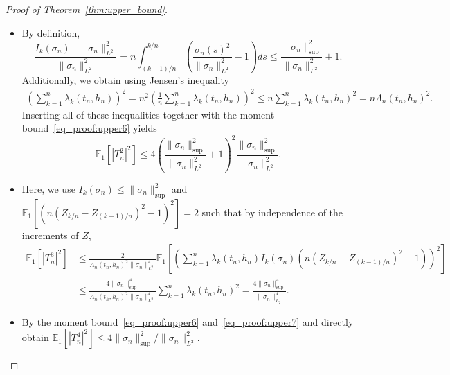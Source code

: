 \documentclass[10.5pt,letter]{article}
\numberwithin{equation}{section}
\theoremstyle{definition}
\newcommand{\E}{\mathbb{E}}
\newcommand{\1}{\mathbbm{1}}
\begin{document}
\begin{proof}[Proof of Theorem~\ref{thm:upper_bound}]
\begin{itemize}
    \item[$\bullet\ \mathbf{T_n^2.}$] By definition,
    \[ \frac{I_k(\sigma_n)-\|\sigma_n\|_{L^2}^2}{\|\sigma_n\|_{L^2}^2} = n\int_{(k-1)/n}^{k/n} \left( \frac{\sigma_n(s)^2}{\|\sigma_n\|_{L^2}^2} -1\right) ds \leq \frac{\|\sigma_n\|_{\sup}^2}{\|\sigma_n\|_{L^2}^2} +1.\]
    Additionally, we obtain using Jensen's inequality
    \begin{align}\label{eq_proof:upper7}
        \left(\sum_{k=1}^n \lambda_k(t_n,h_n)\right)^2 = n^2 \left(\frac1n \sum_{k=1}^n \lambda_k(t_n,h_n)\right)^2 \leq n\sum_{k=1}^n \lambda_k(t_n,h_n)^2 = n\Lambda_n(t_n,h_n)^2.
    \end{align}
    Inserting all of these inequalities together with the moment bound~\eqref{eq_proof:upper6} yields
    \[ \E_1\left[ |T_n^2|^2\right] \leq 4 \left( \frac{\|\sigma_n\|_{\sup}^2}{\|\sigma_n\|_{L^2}^2} +1\right)^2 \frac{\|\sigma_n\|_{\sup}^2}{\|\sigma_n\|_{L^2}^2}. \]
     \smallskip

    \item[$\bullet\ \mathbf{T_n^3.}$] Here, we use $I_k(\sigma_n) \leq \|\sigma_n\|_{\sup}^2$ and $\E_1[(n(Z_{k/n}-Z_{(k-1)/n})^2 -1)^2] =2$ such that by independence of the increments of $Z$,
    \begin{align*}
        \E_1\left[ |T_n^3|^2\right] &\leq \frac{2}{\Lambda_n(t_n,h_n)^2 \|\sigma_n\|_{L^2}^4} \E_1\left[ \left( \sum_{k=1}^n \lambda_k(t_n,h_n) I_k(\sigma_n)\left( n(Z_{k/n}-Z_{(k-1)/n})^2-1\right)\right)^2\right]\\
        & \leq \frac{4 \|\sigma_n\|_{\sup}^4}{\Lambda_n(t_h,h_n)^2\|\sigma_n\|_{L^2}^4} \sum_{k=1}^n \lambda_k(t_n,h_n)^2 = \frac{4\|\sigma_n\|_{\sup}^4}{\|\sigma_n\|_{L_2}^4}.
    \end{align*} 

    \item[$\bullet\ \mathbf{T_n^4.}$] By the moment bound~\eqref{eq_proof:upper6} and~\eqref{eq_proof:upper7} and directly obtain $\E_1\left[ |T_n^4|^2\right] \leq 4\|\sigma_n\|_{\sup}^2/\|\sigma_n\|_{L^2}^2$.
\end{itemize} 

\end{proof}
\end{document}
